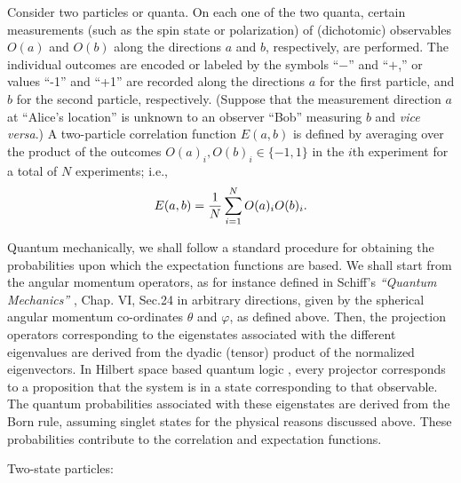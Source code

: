 {Consider two particles or quanta. On each one of the two quanta, certain measurements
(such as the spin state or polarization) of
(dichotomic) observables
$O({ a})$ and
$O({ b})$
along the directions $a$ and $b$, respectively, are performed.
The individual outcomes are
encoded or labeled by the symbols ``$-$'' and  ``$+$,'' or values ``-1'' and ``+1'' are recorded along
the directions ${ a}$ for the first particle, and  ${ b}$ for the second particle, respectively.
(Suppose that the measurement direction ${a}$ at ``Alice's location''
is unknown to an observer ``Bob'' measuring ${ b}$ and {\it vice versa}.)
A two-particle correlation function $E(a,b )$
is defined by averaging over the product of the outcomes $O({ a})_i, O({ b} )_i\in \{-1,1\}$
in the $i$th experiment for a total of $N$ experiments; i.e.,
\begin{equation}
E(a,b )={1\over N}\sum_{i=1}^N O({ a})_i O({ b})_i.
\end{equation}


Quantum mechanically, we shall follow a standard procedure for obtaining the probabilities upon which the expectation functions are based.
We shall start from the angular momentum operators, as for instance defined in Schiff's
{\em ``Quantum Mechanics''} \cite{schiff-55}, Chap. VI, Sec.24
in arbitrary directions, given by the spherical angular momentum co-ordinates $\theta$ and $\varphi$, as defined above.
Then, the projection operators corresponding to the eigenstates associated with the different eigenvalues are derived
from the dyadic (tensor) product of the normalized eigenvectors.
In Hilbert space based \cite{v-neumann-49} quantum logic \cite{birkhoff-36}, every projector corresponds to
a proposition that the system is in a state corresponding to that observable.
The quantum probabilities associated with these eigenstates are derived from the Born rule, assuming singlet states for the physical reasons discussed above.
These probabilities contribute to the correlation and expectation functions.

{Two-state particles:}


}
